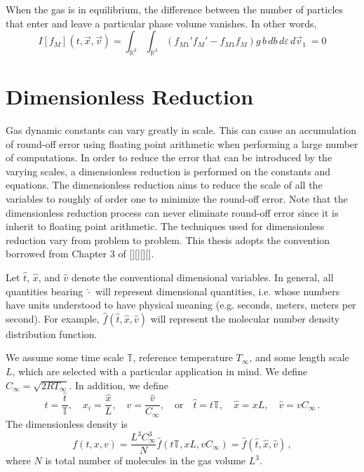 \documentclass[12pt]{CSUNthesis}
\def\T{\mathbb{T}}
\def\R{\mathbb{R}}
\newcommand{\Tref}{T_{\infty}}
\newcommand{\Cref}{C_{\infty}}
\def\T{\mathbb{T}}
\def\R{\mathbb{R}}
\newcommand{\vecx}{\vec{x}}
\newcommand{\vecv}{\vec{v}}
\begin{document}
When the gas is in equilibrium, the difference between the number of particles that enter and leave a particular phase volume vanishes. In other words, 
\begin{equation*}
I[f_M](t,\vecx,\vecv) = \int_{\R^3} \int_{\R^3} (f_{M1}'f_M' - f_{M1} f_M)  g\, b\, db\, d\varepsilon\, d\vecv_1\ = 0
\end{equation*}


\section{Dimensionless Reduction}

Gas dynamic constants can vary greatly in scale. This can cause an accumulation of round-off error using floating point arithmetic when performing a large number of computations. In order to reduce the error that can be introduced by the varying scales, a dimensionless reduction is performed on the constants and equations. The dimensionless reduction aims to reduce the scale of all the variables to roughly of order one to minimize the round-off error. Note that the dimensionless reduction process can never eliminate round-off error since it is inherit to floating point arithmetic. The techniques used for dimensionless reduction vary from problem to problem. This thesis adopts the convention borrowed from Chapter 3 of [][][][].

Let $\hat{t}$, $\hat{x}$, and $\hat{v}$ denote the conventional dimensional variables. In general, all quantities bearing $\hat{\cdot}$ will represent dimensional quantities, i.e. whose numbers have units understood to have physical meaning (e.g. seconds, meters, meters per second). For example, $\hat{f}(\hat{t},\hat{x},\hat{v})$ will represent the molecular number density distribution function.

We assume some time scale $\mathbb{T}$, reference temperature $\Tref$, and some length scale $L$, which are selected with a particular application in mind. We define $\Cref = \sqrt{2R\Tref}$. In addition, we define
\begin{equation}
\label{eq:new_dimless}
t=\frac{\hat{t}}{\T},
\quad x_{i}=\frac{\hat{x}}{L},
\quad v=\frac{\hat{v}}{C_{\infty}}, 
\quad \mbox{or}
\quad \hat{t}=t\T,
\quad \hat{x}=x L,
\quad \hat{v}=vC_{\infty}\, .
\end{equation}
The dimensionless density is
\begin{equation}
f(t,x,v) = \frac{L^3 \Cref^3}{N} \hat{f}(t\mathbb{T},xL, v\Cref) = \hat{f}(\hat{t},\hat{x},\hat{v})\, ,
\end{equation}
where $N$ is total number of molecules in the gas volume $L^3$. 
\end{document}

